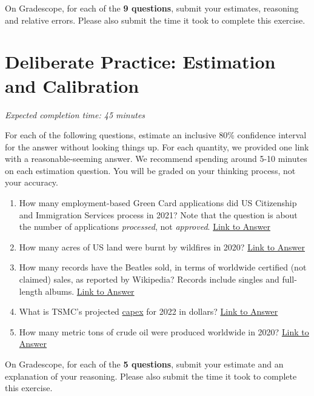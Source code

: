 \documentclass[11pt]{article}
\begin{document}
On Gradescope, for each of the \textbf{9 questions}, submit your estimates, reasoning and relative errors. Please also submit the time it took to complete this exercise.

\section*{Deliberate Practice: Estimation and Calibration}

\emph{Expected completion time: 45 minutes}

For each of the following questions, estimate an inclusive $80\%$ confidence interval for the answer without looking things up. For each quantity, we provided one link with a reasonable-seeming answer. We recommend spending around 5-10 minutes on each estimation question. You will be graded on your thinking process, not your accuracy.

\begin{enumerate}
	\item How many employment-based Green Card applications did US Citizenship and Immigration Services process in 2021? Note that the question is about the number of applications \emph{processed}, not \emph{approved}. \href{https://www.uscis.gov/newsroom/news-releases/uscis-announces-fy-2021-accomplishments}{Link to Answer}
	\item How many acres of US land were burnt by wildfires in 2020? \href{https://sgp.fas.org/crs/misc/IF10244.pdf}{Link to Answer}
	\item How many records have the Beatles sold, in terms of worldwide certified (not claimed) sales, as reported by Wikipedia? Records include singles and full-length albums. \href{https://en.wikipedia.org/wiki/List_of_best-selling_music_artists#250_million_or_more_records}{Link to Answer}
	\item What is TSMC's projected \href{https://en.wikipedia.org/wiki/Capital\_expenditure}{capex} for 2022 in dollars? \href{https://www.reuters.com/technology/tsmc-q4-profit-rises-164-record-beats-market-forecasts-2022-01-13/}{Link to Answer}
	\item How many metric tons of crude oil were produced worldwide in 2020? \href{https://www.statista.com/statistics/265229/global-oil-production-in-million-metric-tons/#:~:text=In$\%$202020$\%$2C$\%$20global$\%$20crude$\%$20oil,about$\%$204.2$\%$20billion$\%$20metric$\%$20tons}{Link to Answer}
\end{enumerate}

On Gradescope, for each of the \textbf{5 questions}, submit your estimate and an explanation of your reasoning. Please also submit the time it took to complete this exercise.
\end{document}
